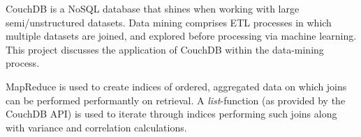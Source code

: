 CouchDB is a NoSQL database that shines when working with large semi/unstructured datasets. Data mining comprises ETL processes in which multiple datasets are joined, and explored before processing via machine learning. This project discusses the application of CouchDB within the data-mining process.

MapReduce is used to create indices of ordered, aggregated data on which joins can be performed performantly on retrieval. A \textit{list}-function (as provided by the CouchDB API) is used to iterate through indices performing such joins along with variance and correlation calculations.
